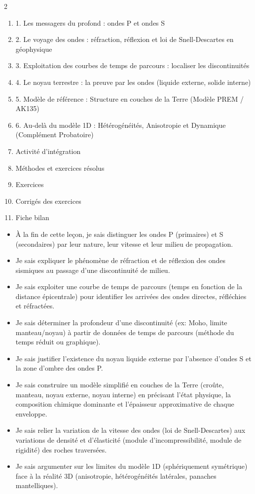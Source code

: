 \documentclass[11pt]{article}
\begin{document}
\begin{sommaire}
\begin{multicols}{2}
\begin{enumerate}
\item 1. Les messagers du profond : ondes P et ondes S
\item 2. Le voyage des ondes : réfraction, réflexion et loi de Snell-Descartes en géophysique
\item 3. Exploitation des courbes de temps de parcours : localiser les discontinuités
\item 4. Le noyau terrestre : la preuve par les ondes (liquide externe, solide interne)
\item 5. Modèle de référence : Structure en couches de la Terre (Modèle PREM / AK135)
\item 6. Au-delà du modèle 1D : Hétérogénéités, Anisotropie et Dynamique (Complément Probatoire)
\item Activité d'intégration
\item Méthodes et exercices résolus
\item Exercices
\item Corrigés des exercices
\item Fiche bilan
\end{enumerate}
\end{multicols}
\end{sommaire}

\begin{objectifs}
\begin{itemize}
\item À la fin de cette leçon, je sais distinguer les ondes P (primaires) et S (secondaires) par leur nature, leur vitesse et leur milieu de propagation.
\item Je sais expliquer le phénomène de réfraction et de réflexion des ondes sismiques au passage d'une discontinuité de milieu.
\item Je sais exploiter une courbe de temps de parcours (temps en fonction de la distance épicentrale) pour identifier les arrivées des ondes directes, réfléchies et réfractées.
\item Je sais déterminer la profondeur d'une discontinuité (ex: Moho, limite manteau/noyau) à partir de données de temps de parcours (méthode du temps réduit ou graphique).
\item Je sais justifier l'existence du noyau liquide externe par l'absence d'ondes S et la zone d'ombre des ondes P.
\item Je sais construire un modèle simplifié en couches de la Terre (croûte, manteau, noyau externe, noyau interne) en précisant l'état physique, la composition chimique dominante et l'épaisseur approximative de chaque enveloppe.
\item Je sais relier la variation de la vitesse des ondes (loi de Snell-Descartes) aux variations de densité et d'élasticité (module d'incompressibilité, module de rigidité) des roches traversées.
\item Je sais argumenter sur les limites du modèle 1D (sphériquement symétrique) face à la réalité 3D (anisotropie, hétérogénéités latérales, panaches mantelliques).
\end{itemize}
\end{objectifs}
\end{document}

